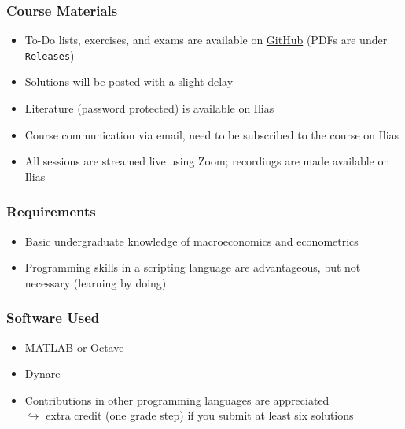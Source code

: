 \documentclass[10pt]{beamer}
\begin{document}
\begin{frame}
\frametitle{Course Materials}
\begin{itemize}
  \item To-Do lists, exercises, and exams are available on \href{https://github.com/wmutschl/Quantitative-Macroeconomics}{GitHub} (PDFs are under \texttt{Releases})
  \item Solutions will be posted with a slight delay
  \item Literature (password protected) is available on Ilias
  \item Course communication via email, need to be subscribed to the course on Ilias
  \item All sessions are streamed live using Zoom; recordings are made available on Ilias
\end{itemize}
\end{frame}

\begin{frame}
\frametitle{Requirements}
\begin{itemize}
  \item Basic undergraduate knowledge of macroeconomics and econometrics
  \item Programming skills in a scripting language are advantageous, but not necessary (learning by doing)
\end{itemize}
\end{frame}

\begin{frame}
\frametitle{Software Used}
\begin{itemize}
  \item MATLAB or Octave
  \item Dynare
  \item Contributions in other programming languages are appreciated\\ \(\hookrightarrow\) extra credit (one grade step) if you submit at least six solutions
\end{itemize}
\end{frame}
\end{document}
